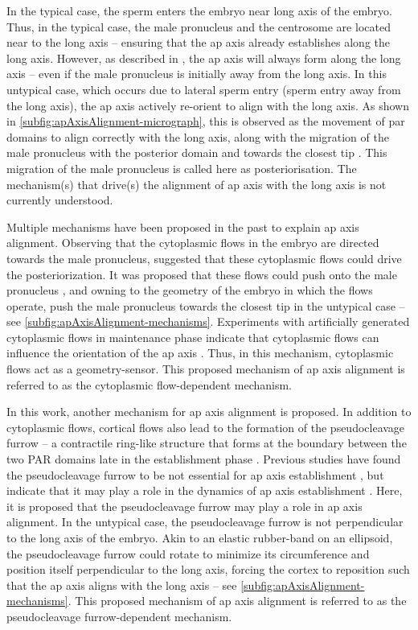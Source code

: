 In the typical case, the sperm enters the embryo near long axis of the embryo. Thus, in the typical case, the male pronucleus and the centrosome are located near to the long axis -- ensuring that the \ac{ap} axis already establishes along the long axis. However, as described in \cite{goldstein1996specification}, the \ac{ap} axis will always form along the long axis -- even if the male pronucleus is initially away from the long axis. In this untypical case, which occurs due to lateral sperm entry (sperm entry away from the long axis), the \ac{ap} axis actively re-orient to align with the long axis. As shown in \autoref{subfig:apAxisAlignment-micrograph}, this is observed as the movement of \ac{par} domains to align correctly with the long axis, along with the migration of the male pronucleus with the posterior domain and towards the closest tip \citep{goldstein1996specification}. This migration of the male pronucleus is called here as posteriorisation. The mechanism(s) that drive(s) the alignment of \ac{ap} axis with the long axis is not currently understood.

Multiple mechanisms have been proposed in the past to explain \ac{ap} axis alignment. Observing that the cytoplasmic flows in the embryo are directed towards the male pronucleus, \cite{goldstein1996specification} suggested that these cytoplasmic flows could drive the posteriorization. It was proposed that these flows could push onto the male pronucleus \citep{kimuraCytoplasmicFlows}, and owning to the geometry of the embryo in which the flows operate, push the male pronucleus towards the closest tip in the untypical case \citep{goldstein1996specification} -- see \autoref{subfig:apAxisAlignment-mechanisms}. Experiments with artificially generated cytoplasmic flows in maintenance phase indicate that cytoplasmic flows can influence the orientation of the \ac{ap} axis \citep{mittasch2018non}. Thus, in this mechanism, cytoplasmic flows act as a geometry-sensor. This proposed mechanism of \ac{ap} axis alignment is referred to as the cytoplasmic flow-dependent mechanism. 

In this work, another mechanism for \ac{ap} axis alignment is proposed. In addition to cytoplasmic flows, cortical flows also lead to the formation of the pseudocleavage furrow -- a contractile ring-like structure that forms at the boundary between the two PAR domains late in the establishment phase \citep{nigon1960architecture,reymann2016cortical}. Previous studies have found the pseudocleavage furrow to be not essential for \ac{ap} axis establishment \citep{rose1995pseudocleavage}, but indicate that it may play a role in the dynamics of \ac{ap} axis establishment \citep{aras2018importance}. Here, it is proposed that the pseudocleavage furrow may play a role in \ac{ap} axis alignment. In the untypical case, the pseudocleavage furrow is not perpendicular to the long axis of the embryo. Akin to an elastic rubber-band on an ellipsoid, the pseudocleavage furrow could rotate to minimize its circumference and position itself perpendicular to the long axis, forcing the cortex to reposition such that the \ac{ap} axis aligns with the long axis  -- see \autoref{subfig:apAxisAlignment-mechanisms}. This proposed mechanism of \ac{ap} axis alignment is referred to as the pseudocleavage furrow-dependent mechanism. 

